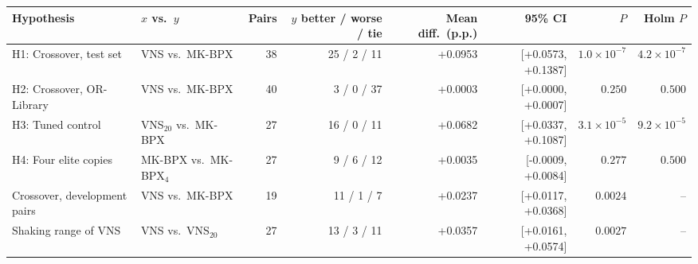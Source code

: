 \begin{tabular}{llrrrrrr}
\toprule
Hypothesis & $x$ vs.\ $y$ & Pairs & $y$ better / worse / tie & Mean diff.\ (p.p.) & 95\% CI & $P$ & Holm $P$ \\
\midrule
H1: Crossover, test set & VNS vs.\ MK-BPX & 38 & 25 / 2 / 11 & +0.0953 & [+0.0573, +0.1387] & $1.0\times10^{-7}$ & $4.2\times10^{-7}$ \\
H2: Crossover, OR-Library & VNS vs.\ MK-BPX & 40 & 3 / 0 / 37 & +0.0003 & [+0.0000, +0.0007] & $0.250$ & $0.500$ \\
H3: Tuned control & VNS$_{20}$ vs.\ MK-BPX & 27 & 16 / 0 / 11 & +0.0682 & [+0.0337, +0.1087] & $3.1\times10^{-5}$ & $9.2\times10^{-5}$ \\
H4: Four elite copies & MK-BPX vs.\ MK-BPX$_{4}$ & 27 & 9 / 6 / 12 & +0.0035 & [-0.0009, +0.0084] & $0.277$ & $0.500$ \\
\midrule
Crossover, development pairs & VNS vs.\ MK-BPX & 19 & 11 / 1 / 7 & +0.0237 & [+0.0117, +0.0368] & $0.0024$ & -- \\
Shaking range of VNS & VNS vs.\ VNS$_{20}$ & 27 & 13 / 3 / 11 & +0.0357 & [+0.0161, +0.0574] & $0.0027$ & -- \\
\bottomrule
\end{tabular}
